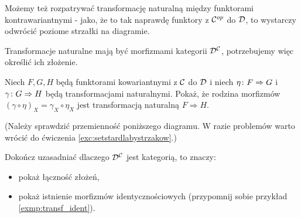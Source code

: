 \begin{remk}
  Możemy też rozpatrywać transformację naturalną między funktorami kontrawariantnymi - jako, że to tak naprawdę funktory z ${\mathcal C}^{op}$ do $\mathcal D$, to wystarczy odwrócić poziome strzałki na diagramie.
\end{remk}

\begin{exc}
  Transformacje naturalne mają być morfizmami kategorii $\mathcal D^\mathcal C$, potrzebujemy więc określić ich złożenie.

  Niech $F, G, H$ będą funktorami kowariantnymi z $\mathcal C$ do $\mathcal D$ i niech $\eta\colon F\Rightarrow G$ i $\gamma\colon G\Rightarrow H$ będą transformacjami naturalnymi. Pokaż, że rodzina morfizmów $(\gamma\circ \eta)_X = \gamma_X\circ \eta_X$ jest transformacją naturalną $F\Rightarrow H$.
  \begin{center}
  \end{center}
  (Należy sprawdzić przemienność poniższego diagramu. W razie problemów warto wrócić do ćwiczenia \ref{exc:setstardlabystrzakow}.)
  \begin{center}
  \end{center}
\end{exc}

\begin{exc}
  Dokończ uzasadniać dlaczego $\mathcal D^\mathcal C$ jest kategorią, to znaczy:
  \begin{itemize}
    \item pokaż łączność złożeń,
    \item pokaż istnienie morfizmów identycznościowych (przypomnij sobie przykład \ref{exmp:transf_ident}).
  \end{itemize}
\end{exc}

